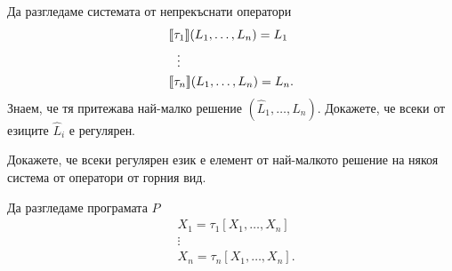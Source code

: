 \begin{problem}
  Да разгледаме системата от непрекъснати оператори
  \begin{align*}
    & \llbracket{\tau_1}\rrbracket(L_1,\dots,L_n) = L_1\\
    & \ \ \vdots\\
    & \llbracket{\tau_n}\rrbracket(L_1,\dots,L_n) = L_n.
  \end{align*}
  Знаем, че тя притежава най-малко решение $(\hat{L}_1,\dots,\hat{L}_n)$.
  Докажете, че всеки от езиците $\hat{L}_i$ е регулярен.

  Докажете, че всеки регулярен език е елемент от най-малкото решение 
  на някоя система от оператори от горния вид.
\end{problem}

Да разгледаме програмата $P$
\begin{align*}
  & X_1 = \tau_1[X_1,\dots,X_n]\\
  & \vdots\\
  & X_n = \tau_n[X_1,\dots,X_n].
\end{align*}









